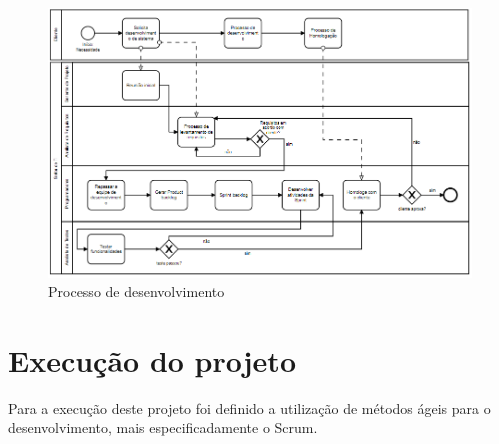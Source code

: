 \documentclass[	DIV=calc,%
							paper=a4,%
							fontsize=12pt,%
							onecolumn]{scrartcl}	 					%
\begin{document}
\begin{figure}
	\centering
	\includegraphics[width=\textwidth]{fig1}
	\caption{Processo de desenvolvimento}
	\label{fig1}
\end{figure}

\section{Execução do projeto}

Para a execução deste projeto foi definido a utilização de métodos ágeis para o desenvolvimento, mais especificadamente o Scrum.
\end{document}
